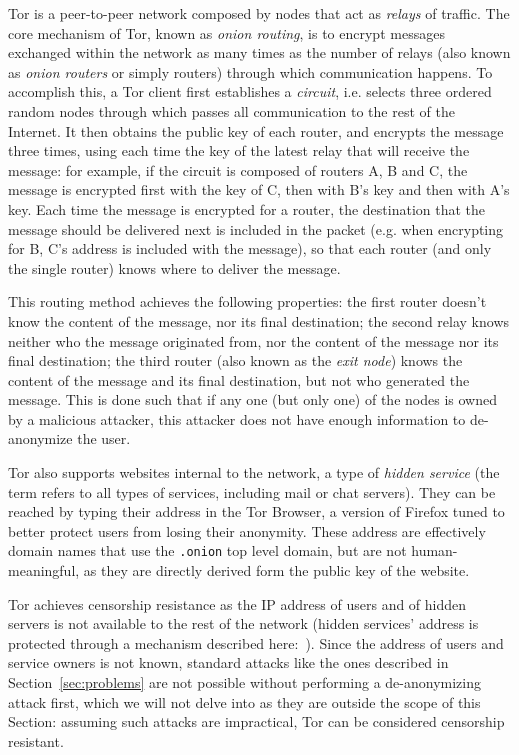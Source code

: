 \documentclass[mscthesis]{usiinfthesis}
\begin{document}
Tor is a peer-to-peer network composed by nodes that act as \emph{relays} of traffic. The core mechanism of Tor, known as \emph{onion routing}, is to encrypt messages exchanged within the network as many times as the number of relays (also known as \emph{onion routers} or simply routers) through which communication happens. To accomplish this, a Tor client first establishes a \emph{circuit}, i.e. selects three ordered random nodes through which passes all communication to the rest of the Internet. It then obtains the public key of each router, and encrypts the message three times, using each time the key of the latest relay that will receive the message: for example, if the circuit is composed of routers A, B and C, the message is encrypted first with the key of C, then with B's key and then with A's key. Each time the message is encrypted for a router, the destination that the message should be delivered next is included in the packet (e.g. when encrypting for B, C's address is included with the message), so that each router (and only the single router) knows where to deliver the message.

This routing method achieves the following properties: the first router doesn't know the content of the message, nor its final destination; the second relay knows neither who the message originated from, nor the content of the message nor its final destination; the third router (also known as the \emph{exit node}) knows the content of the message and its final destination, but not who generated the message. This is done such that if any one (but only one) of the nodes is owned by a malicious attacker, this attacker does not have enough information to de-anonymize the user.

Tor also supports websites internal to the network, a type of \emph{hidden service} (the term refers to all types of services, including mail or chat servers). They can be reached by typing their address in the Tor Browser, a version of Firefox tuned to better protect users from losing their anonymity. These address are effectively domain names that use the \texttt{.onion} top level domain, but are not human-meaningful, as they are directly derived form the public key of the website.

Tor achieves censorship resistance as the IP address of users and of hidden servers is not available to the rest of the network (hidden services' address is protected through a mechanism described here:~\cite{website:torhiddenservice}). Since the address of users and service owners is not known, standard attacks like the ones described in Section~\ref{sec:problems} are not possible without performing a de-anonymizing attack first, which we will not delve into as they are outside the scope of this Section: assuming such attacks are impractical, Tor can be considered censorship resistant. %
\end{document}
